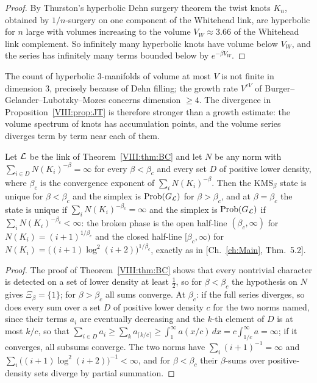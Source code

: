 \begin{proof}
By Thurston's hyperbolic Dehn surgery theorem \cite[Ch.~5]{Thurston} the twist knots $K_n$,
obtained by $1/n$-surgery on one component of the Whitehead link, are hyperbolic for $n$
large with volumes increasing to the volume $V_W\approx3.66$ of the Whitehead link
complement. So infinitely many hyperbolic knots have volume below $V_W$, and the series has
infinitely many terms bounded below by $e^{-\beta V_W}$.
\end{proof}

\begin{remark}
The count of hyperbolic $3$-manifolds of volume at most $V$ is not finite in dimension $3$,
precisely because of Dehn filling; the growth rate $V^{cV}$ of Burger--Gelander--Lubotzky--Mozes
concerns dimension $\ge4$. The divergence in Proposition~\ref{VIII:prop:JT} is therefore stronger
than a growth estimate: the volume spectrum of knots has accumulation points, and the volume
series diverges term by term near each of them.
\end{remark}

\begin{proposition}\label{VIII:prop:closed}
Let $\mathcal{L}$ be the link of Theorem~\ref{VIII:thm:BC} and let $N$ be any norm with
$\sum_{i\in D}N(K_i)^{-\beta}=\infty$ for every $\beta<\beta_c$ and every set $D$ of positive
lower density, where $\beta_c$ is the convergence exponent of $\sum_iN(K_i)^{-\beta}$. Then
the $\mathrm{KMS}_\beta$ state is unique for $\beta<\beta_c$ and the simplex is $\mathrm{Prob}(G_{\mathcal{L}})$
for $\beta>\beta_c$, and at $\beta=\beta_c$ the state is unique if $\sum_iN(K_i)^{-\beta_c}=\infty$
and the simplex is $\mathrm{Prob}(G_{\mathcal{L}})$ if $\sum_iN(K_i)^{-\beta_c}<\infty$: the broken phase is
the open half-line $(\beta_c,\infty)$ for $N(K_i)=(i+1)^{1/\beta_c}$ and the closed half-line
$[\beta_c,\infty)$ for $N(K_i)=\bigl((i+1)\log^2(i+2)\bigr)^{1/\beta_c}$, exactly as in
[Ch.~\ref{ch:Main}, Thm.~5.2].
\end{proposition}

\begin{proof}
The proof of Theorem~\ref{VIII:thm:BC} shows that every nontrivial character is detected on a set
of lower density at least $\frac12$, so for $\beta<\beta_c$ the hypothesis on $N$ gives
$\Xi_\beta=\{1\}$; for $\beta>\beta_c$ all sums converge. At $\beta_c$: if the full series
diverges, so does every sum over a set $D$ of positive lower density $c$ for the two norms
named, since their terms $a_i$ are eventually decreasing and the $k$-th element of $D$ is at
most $k/c$, so that $\sum_{i\in D}a_i\ge\sum_ka_{\lceil k/c\rceil}\ge\int_1^\infty a(x/c)\,dx=c\int_{1/c}^\infty a=\infty$;
if it converges, all subsums converge. The two norms have
$\sum_i(i+1)^{-1}=\infty$ and $\sum_i\bigl((i+1)\log^2(i+2)\bigr)^{-1}<\infty$, and for
$\beta<\beta_c$ their $\beta$-sums over positive-density sets diverge by partial summation.
\end{proof}

